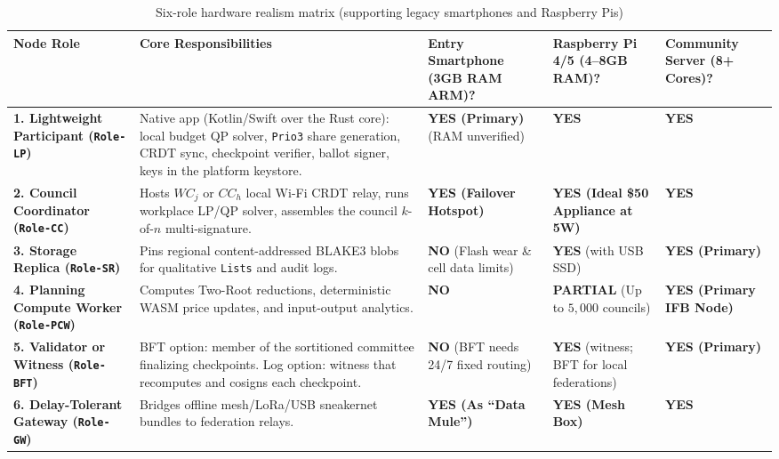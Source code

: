 \documentclass[10pt,twoside,openany]{book}
\theoremstyle{dpepstyle}
\begin{document}
\begin{table}[htbp]
\centering
\caption{Six-role hardware realism matrix (supporting legacy smartphones and Raspberry Pis)}
\label{tab:node-roles}
\scriptsize
\setlength{\tabcolsep}{3.5pt}
\begin{tabularx}{\textwidth}{L{0.98in} L{1.35in} C{0.75in} C{0.75in} Y}
\toprule
\textbf{Node Role} & \textbf{Core Responsibilities} & \textbf{Entry Smartphone (3GB RAM ARM)?} & \textbf{Raspberry Pi 4/5 (4--8GB RAM)?} & \textbf{Community Server (8+ Cores)?} \\
\midrule
\textbf{1. Lightweight Participant (\texttt{Role-LP})} & Native app (Kotlin/Swift over the Rust core): local budget QP solver, \texttt{Prio3} share generation, CRDT sync, checkpoint verifier, ballot signer, keys in the platform keystore. & \textbf{YES (Primary)} (RAM unverified) & \textbf{YES} & \textbf{YES} \\
\addlinespace[3pt]
\textbf{2. Council Coordinator (\texttt{Role-CC})} & Hosts $WC_j$ or $CC_h$ local Wi-Fi CRDT relay, runs workplace LP/QP solver, assembles the council $k$-of-$n$ multi-signature. & \textbf{YES (Failover Hotspot)} & \textbf{YES (Ideal \$50 Appliance at 5W)} & \textbf{YES} \\
\addlinespace[3pt]
\textbf{3. Storage Replica (\texttt{Role-SR})} & Pins regional content-addressed BLAKE3 blobs for qualitative \texttt{Lists} and audit logs. & \textbf{NO} (Flash wear \& cell data limits) & \textbf{YES} (with USB SSD) & \textbf{YES (Primary)} \\
\addlinespace[3pt]
\textbf{4. Planning Compute Worker (\texttt{Role-PCW})} & Computes Two-Root reductions, deterministic WASM price updates, and input-output analytics. & \textbf{NO} & \textbf{PARTIAL} (Up to $5,000$ councils) & \textbf{YES (Primary IFB Node)} \\
\addlinespace[3pt]
\textbf{5. Validator or Witness (\texttt{Role-BFT})} & BFT option: member of the sortitioned committee finalizing checkpoints. Log option: witness that recomputes and cosigns each checkpoint. & \textbf{NO} (BFT needs 24/7 fixed routing) & \textbf{YES} (witness; BFT for local federations) & \textbf{YES (Primary)} \\
\addlinespace[3pt]
\textbf{6. Delay-Tolerant Gateway (\texttt{Role-GW})} & Bridges offline mesh/LoRa/USB sneakernet bundles to federation relays. & \textbf{YES (As ``Data Mule'')} & \textbf{YES (Mesh Box)} & \textbf{YES} \\
\bottomrule
\end{tabularx}
\end{table}
\end{document}
